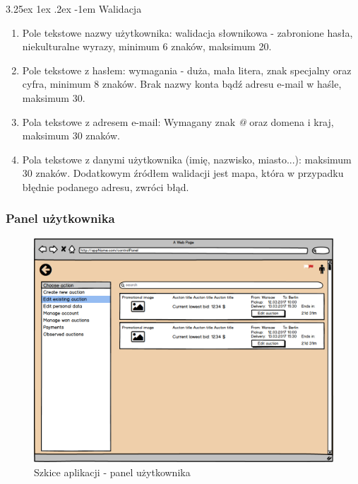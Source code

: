 \documentclass[10pt,titlepage]{article} %
\makeatletter
\renewcommand{\normalsize}{\fontsize{8pt}{10pt}\selectfont} %
\renewcommand\paragraph{\@startsection{paragraph}{5}{\z@}%
  {3.25ex \@plus1ex \@minus.2ex}%
  {-1em}%
  {\normalfont\normalsize\bfseries}}
\makeatother
\begin{document}
\paragraph{Walidacja}\mbox{}\\
\begin{enumerate}[1.]
\item Pole tekstowe nazwy użytkownika: walidacja słownikowa - zabronione hasła, niekulturalne wyrazy, minimum 6 znaków, maksimum 20.
\item Pole tekstowe z hasłem: wymagania - duża, mała litera, znak specjalny oraz cyfra, minimum 8 znaków. Brak nazwy konta bądź adresu e-mail w haśle, maksimum 30.
\item Pola tekstowe z adresem e-mail: Wymagany znak \textit{@} oraz domena i kraj, maksimum 30 znaków.
\item Pola tekstowe z danymi użytkownika (imię, nazwisko, miasto...): maksimum 30 znaków. Dodatkowym źródłem walidacji jest mapa, która w przypadku błędnie podanego adresu, zwróci błąd.
\end{enumerate}


\subsubsection{Panel użytkownika}
\begin{figure}[H]
\includegraphics[width=\textwidth]{img/sekcja2/userPanelMock}
\caption[Szkice aplikacji - panel użytkownika]{Szkice aplikacji - panel użytkownika}
\end{figure}
\end{document}
